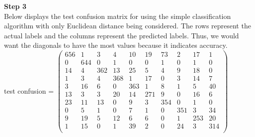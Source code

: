 \documentclass{article}
\begin{document}
\bigskip
\bigskip
\textbf{Step 3} \\ 
Below displays the test confusion matrix for using the simple classification algorithm with only Euclidean distance being considered. The rows represent the actual labels and the columns represent the predicted labels. Thus, we would want the diagonals to have the most values because it indicates accuracy. \\ 
test confusion =  $
\begin{pmatrix}
 656     & 1  &  3  &  4  &  10  &  19  &  73  &  2  &  17 &   1 \\ 
0  &  644 &   0 &   1  &  0  &  0   & 1  &  0 &   1   & 0 \\
14    & 4   & 362   & 13   & 25   & 5    &4  &  9  &  18  &  0 \\
1  &  3  &  4  &  368 &   1  &  17 &   0 &   3 &   14 &   7 \\
3   & 16 &   6   & 0  &  363  &  1  &  8   & 1    &5  &  40 \\
13  &  3  &  3   & 20    &14  &  271  &  9  &  0   & 16   & 6 \\
23   & 11  &  13  &  0 &   9   & 3  &  354   & 0   & 1  &  0 \\
0  &  5  &  1  &  0  &  7  &  1 &   0   & 351  &  3  &  34 \\
9  &  19  &  5   & 12  &  6   & 6   & 0   & 1   & 253   & 20 \\
1   & 15  &  0  &  1   & 39  &  2 &   0  &  24  &  3   & 314 \\
\end{pmatrix} $
\\
\end{document}
